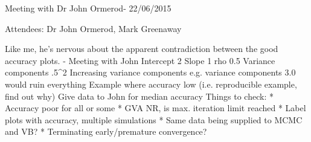 \documentclass{amsart}
\begin{document}
Meeting with Dr John Ormerod- 22/06/2015

Attendees: Dr John Ormerod, Mark Greenaway

Like me, he's nervous about the apparent contradiction between the good accuracy
plots.
- Meeting with John
  Intercept 2
  Slope 1
  rho 0.5
  Variance components .5^2
  Increasing variance components e.g. variance components 3.0 would ruin everything
  Example where accuracy low (i.e. reproducible example, find out why)
  Give data to John for median accuracy
  Things to check:
  * Accuracy poor for all or some
  * GVA NR, is max. iteration limit reached
  * Label plots with accuracy, multiple simulations
  * Same data being supplied to MCMC and VB?
  * Terminating early/premature convergence?
\end{document}
